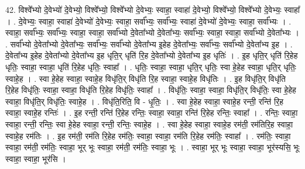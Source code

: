 \documentclass[17pt]{extarticle}
\begin{document}
42. विश्वे᳚भ्यो दे॒वेभ्यो॑ दे॒वेभ्यो॒ विश्वे᳚भ्यो॒ विश्वे᳚भ्यो दे॒वेभ्यः॒ स्वाहा॒ स्वाहा॑ दे॒वेभ्यो॒ विश्वे᳚भ्यो॒ विश्वे᳚भ्यो दे॒वेभ्यः॒ स्वाहा᳚ । . दे॒वेभ्यः॒ स्वाहा॒ स्वाहा॑ दे॒वेभ्यो॑ दे॒वेभ्यः॒ स्वाहा॒ सर्वा᳚भ्यः॒ सर्वा᳚भ्यः॒ स्वाहा॑ दे॒वेभ्यो॑ दे॒वेभ्यः॒ स्वाहा॒ सर्वा᳚भ्यः । . स्वाहा॒ सर्वा᳚भ्यः॒ सर्वा᳚भ्यः॒ स्वाहा॒ स्वाहा॒ सर्वा᳚भ्यो दे॒वेता᳚भ्यो दे॒वेता᳚भ्यः॒ सर्वा᳚भ्यः॒ स्वाहा॒ स्वाहा॒ सर्वा᳚भ्यो दे॒वेता᳚भ्यः । . सर्वा᳚भ्यो दे॒वेता᳚भ्यो दे॒वेता᳚भ्यः॒ सर्वा᳚भ्यः॒ सर्वा᳚भ्यो दे॒वेता᳚भ्य इ॒हेह दे॒वेता᳚भ्यः॒ सर्वा᳚भ्यः॒ सर्वा᳚भ्यो दे॒वेता᳚भ्य इ॒ह । . दे॒वेता᳚भ्य इ॒हेह दे॒वेता᳚भ्यो दे॒वेता᳚भ्य इ॒ह धृति॒र् धृति॑ रि॒ह दे॒वेता᳚भ्यो दे॒वेता᳚भ्य इ॒ह धृतिः॑ । . इ॒ह धृति॒र् धृति॑ रि॒हेह धृतिः॒ स्वाहा॒ स्वाहा॒ धृति॑ रि॒हेह धृतिः॒ स्वाहा᳚ । . धृतिः॒ स्वाहा॒ स्वाहा॒ धृति॒र् धृतिः॒ स्वा हे॒हेह स्वाहा॒ धृति॒र् धृतिः॒ स्वाहे॒ह । . स्वा हे॒हेह स्वाहा॒ स्वाहे॒ह विधृ॑ति॒र् विधृ॑ति रि॒ह स्वाहा॒ स्वाहे॒ह विधृ॑तिः । . इ॒ह विधृ॑ति॒र् विधृ॑ति रि॒हेह विधृ॑तिः॒ स्वाहा॒ स्वाहा॒ विधृ॑ति रि॒हेह विधृ॑तिः॒ स्वाहा᳚ । . विधृ॑तिः॒ स्वाहा॒ स्वाहा॒ विधृ॑ति॒र् विधृ॑तिः॒ स्वा हे॒हेह स्वाहा॒ विधृ॑ति॒र् विधृ॑तिः॒ स्वाहे॒ह । . विधृ॑ति॒रिति॒ वि - धृ॒तिः॒ । . स्वा हे॒हेह स्वाहा॒ स्वाहे॒ह रन्ती॒ रन्ति॑ रि॒ह स्वाहा॒ स्वाहे॒ह रन्तिः॑ । . इ॒ह रन्ती॒ रन्ति॑ रि॒हेह रन्तिः॒ स्वाहा॒ स्वाहा॒ रन्ति॑ रि॒हेह रन्तिः॒ स्वाहा᳚ । . रन्तिः॒ स्वाहा॒ स्वाहा॒ रन्ती॒ रन्तिः॒ स्वा हे॒हेह स्वाहा॒ रन्ती॒ रन्तिः॒ स्वाहे॒ह । . स्वा हे॒हेह स्वाहा॒ स्वाहे॒ह रम॑ती॒ रम॑तिरि॒ह स्वाहा॒ स्वाहे॒ह रम॑तिः । . इ॒ह रम॑ती॒ रम॑ति रि॒हेह रम॑तिः॒ स्वाहा॒ स्वाहा॒ रम॑ति रि॒हेह रम॑तिः॒ स्वाहा᳚ । . रम॑तिः॒ स्वाहा॒ स्वाहा॒ रम॑ती॒ रम॑तिः॒ स्वाहा॒ भूर् भूः स्वाहा॒ रम॑ती॒ रम॑तिः॒ स्वाहा॒ भूः । . स्वाहा॒ भूर् भूः स्वाहा॒ स्वाहा॒ भूर॑स्यसि॒ भूः स्वाहा॒ स्वाहा॒ भूर॑सि । \newline
\end{document}
